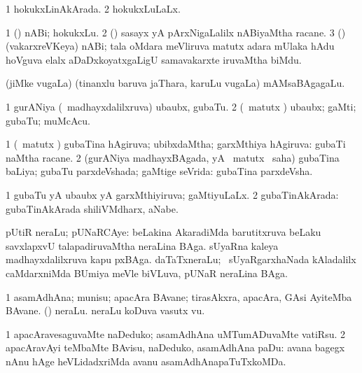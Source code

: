 \bentry
{} 
\gl{\gu}
\expl{}
\bmng
\bnum
\num{1} hokukxLinAkArada. 
\num{2} hokukxLuLaLx. 
\enum
\emng
\eentry

\bentry
{} 
\gl{\nA}
\bmng
\bnum
\num{1} (\aMrashA) nABi; hokukxLu. 
\num{2} (\jiVvi) sasayx yA pArxNigaLalilx nABiyaMtha racane. 
\num{3} (\jAyx) (vakarxreVKeya) nABi; tala oMdara meVliruva matutx adara mUlaka hAdu hoVguva elalx aDaDxkoyatxgaLigU samavakarxte iruvaMtha biMdu. 
\enum
\emng
\eentry

\bentry
{} 
\gl{\nA}
\expl{}
\bmng
(jiMke \mo vugaLa) (tinanxlu baruva jaThara, karuLu \mo vugaLa) mAMsaBAgagaLu. 
\emng
\eentry

\bentry
{} 
\gl{\nA}
\bmng
\bnum
\num{1} gurANiya (\kanmu\ madhayxdalilxruva) ubaubx, gubaTu. 
\num{2} (\savi\ matutx \pArxvi) ubaubx; gaMti; gubaTu; muMcAcu. 
\enum
\emng
\eentry

\bentry
{} 
\gl{\gu}
\expl{}
\bmng
\bnum
\num{1} (\savi\ matutx \pArxvi) gubaTina hAgiruva; ubibxdaMtha; garxMthiya hAgiruva:  gubaTi naMtha racane. 
\num{2} (gurANiya madhayxBAgada, yA \savi\ matutx \pArxvi\ saha) gubaTina baLiya; gubaTu parxdeVshada; gaMtige seVrida:  gubaTina parxdeVsha. 
\enum
\emng
\eentry

\bentry
{} 
\gl{\gu}
\expl{}
\bmng
\bnum
\num{1} gubaTu yA ubaubx yA garxMthiyiruva; gaMtiyuLaLx. 
\num{2} gubaTinAkArada:  gubaTinAkArada shiliVMdharx, aNabe. 
\enum
\emng
\eentry

\bentry
{} 
\gl{\nA}
\expl{}
\bmng
pUtiR neraLu; pUNaRCAye: 
\banum
{} beLakina AkaradiMda barutitxruva beLaku savxlapxvU talapadiruvaMtha neraLina BAga. 
 sUyaRna kaleya madhayxdalilxruva kapu pxBAga. 
 daTaTxneraLu; \sA\ sUyaRgarxhaNada kAladalilx caMdarxniMda BUmiya meVle biVLuva, pUNaR neraLina BAga. 
\eanum
\emng
\eentry

\bentry
{} 
\gl{\nA}
\bmng
\bnum
\num{1} asamAdhAna; munisu; apacAra BAvane; tirasAkxra, apacAra, GAsi AyiteMba BAvane. 
 (\pArxparx) 
\banum
{} neraLu. 
 neraLu koDuva vasutx \mo vu. 
\eanum
\numie
\enum
\emng

\noindent 
\gl{\pagu}
\expl{}
\bmng
\bnum
\num{1}  apacAravesaguvaMte naDeduko; asamAdhAna uMTumADuvaMte vatiRsu. 
\num{2}  apacAravAyi teMbaMte BAvisu, naDeduko, asamAdhAna paDu:  avana bagegx nAnu hAge heVLidadxriMda avanu asamAdhAnapaTuTxkoMDa. 
\enum
\emng
\eentry

